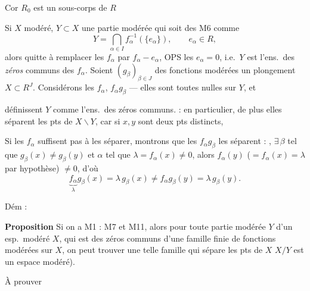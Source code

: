\documentclass[11pt,a4paper]{article}
\begin{document}
\struck{\ill{}} Cor \quad $R_0$ est un sous-corps de $R$

Si $X$ modéré, $Y \subset X$ une partie modérée qui soit 
 des M6 comme
\[
  Y = \bigcap_{\alpha \in I} f_\alpha^{-1}(\lbrace e_\alpha \rbrace),
  \qquad e_\alpha \in R ,
\]
alors quitte à remplacer les $f_\alpha$ par $f_\alpha - e_\alpha$, OPS les
$e_\alpha = 0$, i.e.\ $Y$ est l'ens.\ des \emph{zéros} communs des
$f_\alpha$. Soient $(g_\beta)_{\beta \in J}$  des fonctions
modérées  un plongement $X \subset R^J$. Considérons les
$f_\alpha$, $f_\alpha g_\beta$ --- elles sont toutes nulles sur $Y$, et


 définissent $Y$ comme l'ens.\ des zéros communs.
 : en particulier, de plus elles séparent les pts de
$X \smallsetminus Y$, car si $x, y$ sont deux pts distincts,

Si les $f_\alpha$ \struck{\ill{}} suffisent pas à les séparer, montrons que
les $f_\alpha g_\beta$ les séparent : , $\exists\, \beta$
tel que $g_\beta(x) \neq g_\beta(y)$  et $\alpha$ tel que
$\lambda = f_\alpha(x) \neq 0$, alors $f_\alpha(y)$ ($= f_\alpha(x) =
\lambda$ par hypothèse) $\neq 0$, d'où
\[
  \underbrace{f_\alpha}_{\lambda} g_\beta(x) = \lambda\, g_\beta(x)
  \neq f_\alpha g_\beta(y) = \lambda\, g_\beta(y) .
\]

Dém :

\textbf{Proposition} Si on a M1 : M7 et M11, alors pour toute partie
 modérée $Y$ d'un esp.\ modéré $X$,
qui est \ill{} des zéros communs d'une famille finie de fonctions modérées
sur $X$, on peut trouver une telle famille qui sépare les pts de $X$
\ill{} $X/Y$ est un espace modéré).


À prouver
\end{document}
